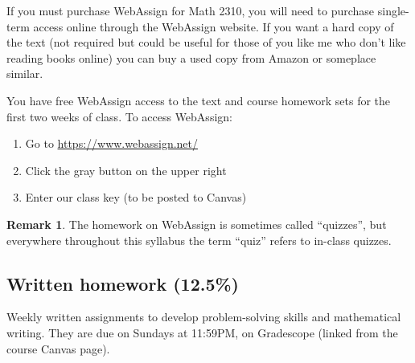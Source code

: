 \documentclass[oneside,11pt]{amsart}
\theoremstyle{definition}
\newtheorem{remark}{Remark}
\begin{document}
If you must purchase WebAssign for Math 2310, you will need to purchase single-term access online through the WebAssign website. If you want a hard copy of the text (not required but could be useful for those of you like me who don't like reading books online) you can buy a used copy from Amazon or someplace similar.

You have free WebAssign access to the text and course homework sets for the first two weeks of class. To access WebAssign:

\begin{enumerate}
    \item Go to \url{https://www.webassign.net/}
    \item Click the gray button on the upper right
		\item Enter our class key (to be posted to Canvas)
\end{enumerate}

\begin{remark}
	The homework on WebAssign is sometimes called ``quizzes'', but everywhere throughout this syllabus the term ``quiz'' refers to in-class quizzes.
\end{remark}


\subsection{Written homework (12.5\%)} Weekly written assignments to develop problem-solving skills and mathematical writing. They are due on Sundays at 11:59PM, on Gradescope (linked from the course Canvas page).
\end{document}

